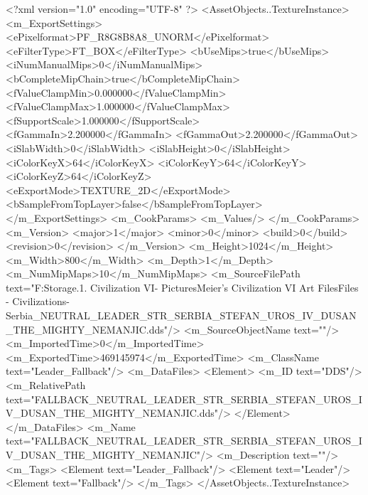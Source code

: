 <?xml version="1.0" encoding="UTF-8" ?>
<AssetObjects..TextureInstance>
	<m_ExportSettings>
		<ePixelformat>PF_R8G8B8A8_UNORM</ePixelformat>
		<eFilterType>FT_BOX</eFilterType>
		<bUseMips>true</bUseMips>
		<iNumManualMips>0</iNumManualMips>
		<bCompleteMipChain>true</bCompleteMipChain>
		<fValueClampMin>0.000000</fValueClampMin>
		<fValueClampMax>1.000000</fValueClampMax>
		<fSupportScale>1.000000</fSupportScale>
		<fGammaIn>2.200000</fGammaIn>
		<fGammaOut>2.200000</fGammaOut>
		<iSlabWidth>0</iSlabWidth>
		<iSlabHeight>0</iSlabHeight>
		<iColorKeyX>64</iColorKeyX>
		<iColorKeyY>64</iColorKeyY>
		<iColorKeyZ>64</iColorKeyZ>
		<eExportMode>TEXTURE_2D</eExportMode>
		<bSampleFromTopLayer>false</bSampleFromTopLayer>
	</m_ExportSettings>
	<m_CookParams>
		<m_Values/>
	</m_CookParams>
	<m_Version>
		<major>1</major>
		<minor>0</minor>
		<build>0</build>
		<revision>0</revision>
	</m_Version>
	<m_Height>1024</m_Height>
	<m_Width>800</m_Width>
	<m_Depth>1</m_Depth>
	<m_NumMipMaps>10</m_NumMipMaps>
	<m_SourceFilePath text="F:\Mod Storage\2.1. Civilization VI\Mods\Archive - Pictures\Sid Meier's Civilization VI Art Files\Art Files - Civilizations\Civilization - Serbia\FALLBACK_NEUTRAL_LEADER_STR_SERBIA_STEFAN_UROS_IV_DUSAN_THE_MIGHTY_NEMANJIC.dds"/>
	<m_SourceObjectName text=""/>
	<m_ImportedTime>0</m_ImportedTime>
	<m_ExportedTime>469145974</m_ExportedTime>
	<m_ClassName text="Leader_Fallback"/>
	<m_DataFiles>
		<Element>
			<m_ID text="DDS"/>
			<m_RelativePath text="FALLBACK_NEUTRAL_LEADER_STR_SERBIA_STEFAN_UROS_IV_DUSAN_THE_MIGHTY_NEMANJIC.dds"/>
		</Element>
	</m_DataFiles>
	<m_Name text="FALLBACK_NEUTRAL_LEADER_STR_SERBIA_STEFAN_UROS_IV_DUSAN_THE_MIGHTY_NEMANJIC"/>
	<m_Description text=""/>
	<m_Tags>
		<Element text="Leader_Fallback"/>
		<Element text="Leader"/>
		<Element text="Fallback"/>
	</m_Tags>
</AssetObjects..TextureInstance>

